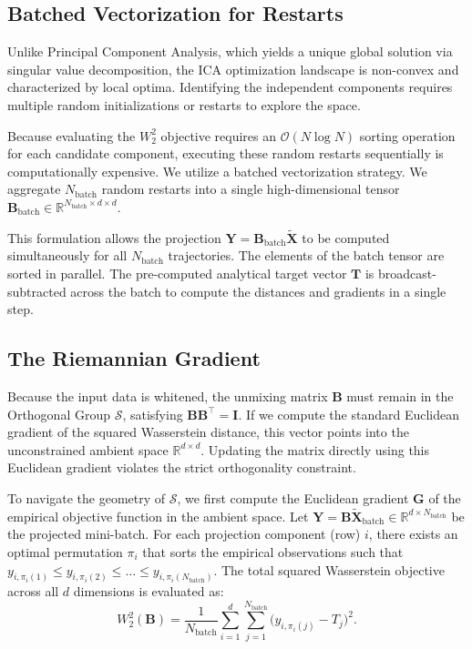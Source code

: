\documentclass[12pt,a4paper,twoside,openany]{book}
\begin{document}
\subsection{Batched Vectorization for Restarts}
Unlike Principal Component Analysis, which yields a unique global solution via singular value decomposition, 
the ICA optimization landscape is non-convex and characterized by local optima. Identifying the independent components 
requires multiple random initializations or restarts to explore the space.

Because evaluating the $W_2^2$ objective requires an $\mathcal{O}(N \log N)$ sorting operation for each candidate component, 
executing these random restarts sequentially is computationally expensive. We utilize a batched vectorization strategy. 
We aggregate $N_{\text{batch}}$ random restarts into a single high-dimensional tensor $\mathbf{B}_{\text{batch}} \in \mathbb{R}^{N_{\text{batch}} \times d \times d}$. 

This formulation allows the projection $\mathbf{Y} = \mathbf{B}_{\text{batch}} \widetilde{\mathbf{X}}$ to be computed simultaneously for all $N_{\text{batch}}$ trajectories. 
The elements of the batch tensor are sorted in parallel. 
The pre-computed analytical target vector $\mathbf{T}$ is broadcast-subtracted across the batch to compute the distances and gradients in a single step.

\subsection{The Riemannian Gradient}
Because the input data is whitened, the unmixing matrix $\mathbf{B}$ must remain in the Orthogonal Group $\mathcal{S}$, satisfying $\mathbf{B}\mathbf{B}^\top = \mathbf{I}$. 
If we compute the standard Euclidean gradient of the squared Wasserstein distance, this vector points into the unconstrained ambient space $\mathbb{R}^{d \times d}$. 
Updating the matrix directly using this Euclidean gradient violates the strict orthogonality constraint.

To navigate the geometry of $\mathcal{S}$, we first compute the Euclidean gradient $\mathbf{G}$ of the empirical objective function in the ambient space. 
Let $\mathbf{Y} = \mathbf{B} \widetilde{\mathbf{X}}_{\text{batch}} \in \mathbb{R}^{d \times N_{\text{batch}}}$ be the projected mini-batch. For each projection component (row) $i$, 
there exists an optimal permutation $\pi_i$ that sorts the empirical observations such that $y_{i, \pi_i(1)} \le y_{i, \pi_i(2)} \le \dots \le y_{i, \pi_i(N_{\text{batch}})}$. 
The total squared Wasserstein objective across all $d$ dimensions is evaluated as:
\begin{equation}
    W_2^2(\mathbf{B}) = \frac{1}{N_{\text{batch}}} \sum_{i=1}^d \sum_{j=1}^{N_{\text{batch}}} \big( y_{i, \pi_i(j)} - T_j \big)^2.
\end{equation}
\end{document}
